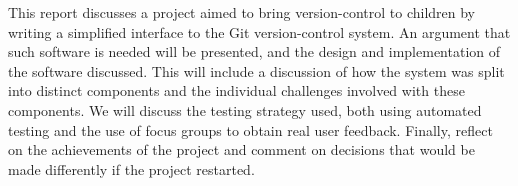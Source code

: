 This report discusses a project aimed to bring version-control to children by writing a simplified interface to the Git version-control system. An argument that such software is needed will be presented, and the design and implementation of the software discussed. This will include a discussion of how the system was split into distinct components and the individual challenges involved with these components. We will discuss the testing strategy used, both using automated testing and the use of focus groups to obtain real user feedback. Finally, reflect on the achievements of the project and comment on decisions that would be made differently if the project restarted.